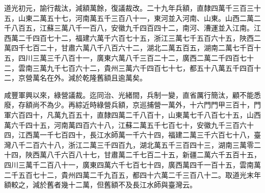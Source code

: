 \begin{pinyinscope}
道光初元，諭行裁汰，減額萬餘，復議裁改。二十九年兵額，直隸四萬千三百三十五，山東二萬五十七，河南萬五千三百八十一，東河並入河南、山東。山西二萬二千八百五，江蘇三萬八千一百八，安徽九千四百四十二，南河、漕運並入江南。江西萬二千四百七十二，福建六萬千六百七十五，浙江三萬七千五百六十五，陜西二萬四千七百二十，甘肅六萬八千八百六十二，湖北二萬五百五，湖南二萬七千百十五，四川三萬三千八百十一，廣東六萬八千三百二十二，廣西二萬二千四百七十二，雲南三萬九千七百六十二，貴州三萬六千四百七十七，都五十八萬五千四百十二，京營萬名在外。減於乾隆舊額且逾萬矣。

咸豐軍興以來，綠營議裁。迄同治、光緒間，兵制一變，直省厲行簡汰，顧不能悉廢，存額尚不為少。再綜近時綠營兵額，京巡捕營一萬外，十六門門甲三百十，門軍六百四十，凡萬九百五十，直隸四萬二千八百十，山東萬七千八百七十五，山西萬六千四十五，河南萬四百六十八，江蘇二萬五千七百七十，安徽九千三百六十四，江西萬一千七百四十，長江水師萬一千六十四，福建二萬三千六百七十八，臺灣八千二百六十八，浙江二萬三千四百九，湖北萬五千三百四十三，湖南三萬零二十四，陜西萬八千六百八十七，甘肅萬二千七百二十五，新疆二萬六千五百十五，四川三萬千二百八十一，廣東四萬六千七百七十四，廣西萬四千一百十五，雲南萬二千五百七十二，貴州四萬二千九百五，都四十六萬二千三百八十二。取道光末年額較之，減於舊者幾十二萬，但舊額不及長江水師與臺灣云。


\end{pinyinscope}